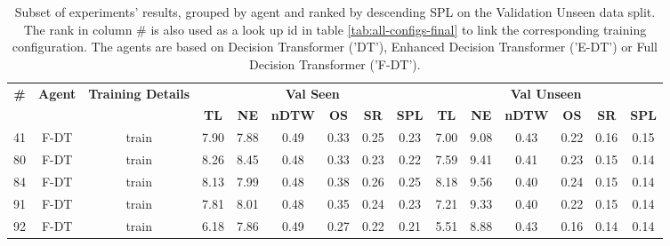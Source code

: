 \begin{table}
\centering
\caption{\label{tab:full_dt_ablation}Subset of experiments' results, grouped by agent and ranked by descending SPL on the Validation Unseen data split. The rank in column \# is also used as a look up id in table \ref{tab:all-configs-final} to link the corresponding training configuration.     \newline The agents are based on Decision Transformer ('DT'), Enhanced Decision Transformer ('E-DT') or Full Decision Transformer ('F-DT').}
\begin{tabular}{@{\hskip3pt}c@{\hskip3pt}c@{\hskip3pt}c@{\hskip3pt}c@{\hskip3pt}c@{\hskip3pt}c@{\hskip3pt}c@{\hskip3pt}c@{\hskip3pt}c@{\hskip3pt}c@{\hskip3pt}c@{\hskip3pt}c@{\hskip3pt}c@{\hskip3pt}c@{\hskip3pt}c}
\toprule
\textbf{\#} & \textbf{Agent} & \textbf{Training Details} & \multicolumn{6}{c}{\textbf{Val Seen}} & \multicolumn{6}{c}{\textbf{Val Unseen}} \\
 \textbf{~} &     \textbf{~} &                \textbf{~} &       \textbf{TL} & \textbf{NE} & \textbf{nDTW} & \textbf{OS} & \textbf{SR} & \textbf{SPL} &         \textbf{TL} & \textbf{NE} & \textbf{nDTW} & \textbf{OS} & \textbf{SR} & \textbf{SPL} \\
\midrule
         41 &           F-DT &                     train &              7.90 &        7.88 &          0.49 &        0.33 &        0.25 &         0.23 &                7.00 &        9.08 &          0.43 &        0.22 &        0.16 &         0.15 \\
         80 &           F-DT &                     train &              8.26 &        8.45 &          0.48 &        0.33 &        0.23 &         0.22 &                7.59 &        9.41 &          0.41 &        0.23 &        0.15 &         0.14 \\
         84 &           F-DT &                     train &              8.13 &        7.99 &          0.48 &        0.38 &        0.26 &         0.25 &                8.18 &        9.56 &          0.40 &        0.24 &        0.15 &         0.14 \\
         91 &           F-DT &                     train &              7.81 &        8.01 &          0.48 &        0.35 &        0.24 &         0.23 &                7.21 &        9.33 &          0.40 &        0.22 &        0.15 &         0.14 \\
         92 &           F-DT &                     train &              6.18 &        7.86 &          0.49 &        0.27 &        0.22 &         0.21 &                5.51 &        8.88 &          0.43 &        0.16 &        0.14 &         0.14 \\

\end{tabular}
\end{table}

